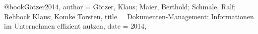 @book{Götzer2014,
	author = {Götzer, Klaus; Maier, Berthold; Schmale, Ralf; Rehbock Klaus; Komke Torsten},
	title = {Dokumenten-Management: Informationen im Unternehmen effizient nutzen},
	date = {2014},
}
